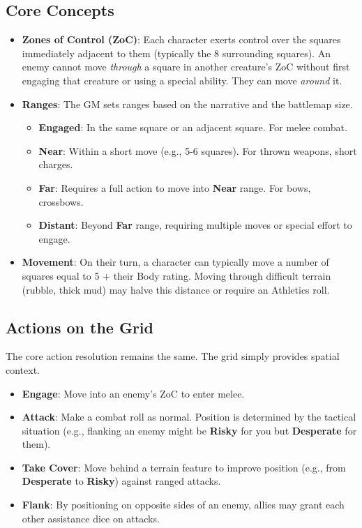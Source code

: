 \subsection*{Core Concepts}

\begin{itemize}
    \item \textbf{Zones of Control (ZoC)}: Each character exerts control over the squares immediately adjacent to them (typically the 8 surrounding squares). An enemy cannot move \textit{through} a square in another creature's ZoC without first engaging that creature or using a special ability. They can move \textit{around} it.
    \item \textbf{Ranges}: The GM sets ranges based on the narrative and the battlemap size.
        \begin{itemize}
            \item \textbf{Engaged}: In the same square or an adjacent square. For melee combat.
            \item \textbf{Near}: Within a short move (e.g., 5-6 squares). For thrown weapons, short charges.
            \item \textbf{Far}: Requires a full action to move into \textbf{Near} range. For bows, crossbows.
            \item \textbf{Distant}: Beyond \textbf{Far} range, requiring multiple moves or special effort to engage.
        \end{itemize}
    \item \textbf{Movement}: On their turn, a character can typically move a number of squares equal to 5 + their Body rating. Moving through difficult terrain (rubble, thick mud) may halve this distance or require an Athletics roll.
\end{itemize}

\subsection*{Actions on the Grid}

The core action resolution remains the same. The grid simply provides spatial context.
\begin{itemize}
    \item \textbf{Engage}: Move into an enemy's ZoC to enter melee.
    \item \textbf{Attack}: Make a combat roll as normal. Position is determined by the tactical situation (e.g., flanking an enemy might be \textbf{Risky} for you but \textbf{Desperate} for them).
    \item \textbf{Take Cover}: Move behind a terrain feature to improve position (e.g., from \textbf{Desperate} to \textbf{Risky}) against ranged attacks.
    \item \textbf{Flank}: By positioning on opposite sides of an enemy, allies may grant each other assistance dice on attacks.
\end{itemize}

